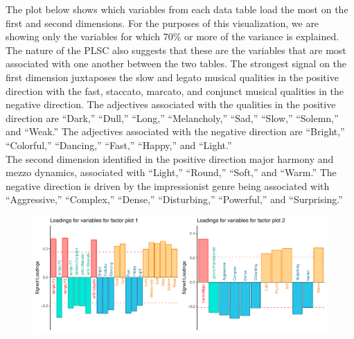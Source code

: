 \documentclass[
  english,
  man,floatsintext]{apa6}
\begin{document}
The plot below shows which variables from each data table load the most on the first and second dimensions. For the purposes of this visualization, we are showing only the variables for which 70\% or more of the variance is explained. The nature of the PLSC also suggests that these are the variables that are most associated with one another between the two tables. The strongest signal on the first dimension juxtaposes the slow and legato musical qualities in the positive direction with the fast, staccato, marcato, and conjunct musical qualities in the negative direction. The adjectives associated with the qualities in the positive direction are ``Dark,'' ``Dull,'' ``Long,'' ``Melancholy,'' ``Sad,'' ``Slow,'' ``Solemn,'' and ``Weak.'' The adjectives associated with the negative direction are ``Bright,'' ``Colorful,'' ``Dancing,'' ``Fast,'' ``Happy,'' and ``Light.''\\
The second dimension identified in the positive direction major harmony and mezzo dynamics, associated with ``Light,'' ``Round,'' ``Soft,'' and ``Warm.'' The negative direction is driven by the impressionist genre being associated with ``Aggressive,'' ``Complex,'' ``Dense,'' ``Disturbing,'' ``Powerful,'' and ``Surprising.''

\begin{figure}

{\centering \includegraphics{Music-Descriptor-Space_files/figure-latex/loadingsplsc-1} 

}

\caption{ }\label{fig:loadingsplsc}
\end{figure}
\end{document}
